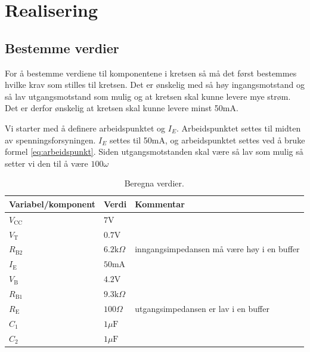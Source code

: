 \newpage
\section{Realisering}
\label{realiseringOgTest}

\subsection[Bestemme verdier]{Bestemme verdier}
\label{bestemmeVerdier}

For å bestemme verdiene til komponentene i kretsen så må det først bestemmes hvilke krav som stilles til kretsen. Det er ønskelig med så høy ingangsmotstand og så lav utgangsmotstand som mulig og at kretsen skal kunne levere mye strøm. %
Det er derfor ønskelig at kretsen skal kunne levere minst 50mA.

Vi starter med å definere arbeidspunktet og $I_E$. Arbeidspunktet settes til midten av spenningsforsyningen. $I_E$ settes til 50mA, og arbeidspunktet settes ved å bruke formel \ref{eq:arbeidspunkt}. Siden utgangsmotstanden skal være så lav som mulig så setter vi den til å være $100\omega$


\vspace{1cm}
\begin{table}[!h]
\centering %
\caption{Beregna verdier.}
\label{tab:vars}	%
\begin{tabular}{lll} %
\toprule %
\textbf{Variabel/komponent} & \textbf{Verdi} & \textbf{Kommentar} \\
\midrule
$V_{\text{CC}}$ & $7\text{V}$ & \\
$V_\text{T}$ & $0.7\text{V}$ & \\
$R_{\text{B}2}$ & $6.2\text{k}\Omega$ & inngangsimpedansen må være høy i en buffer \\
$I_\text{E}$ & $50\text{mA}$ & \\
$V_\text{B}$ & $4.2\text{V}$ & \\
$R_{\text{B}1}$ & $9.3\text{k}\Omega$ & \\
$R_\text{E}$ & $100\Omega$ & utgangsimpedansen er lav i en buffer \\
$C_1$ & $1\mu\text{F}$ & \\
$C_2$ & $1\mu\text{F}$ & \\
\bottomrule 
\end{tabular}
\end{table}
\vspace{1cm}


